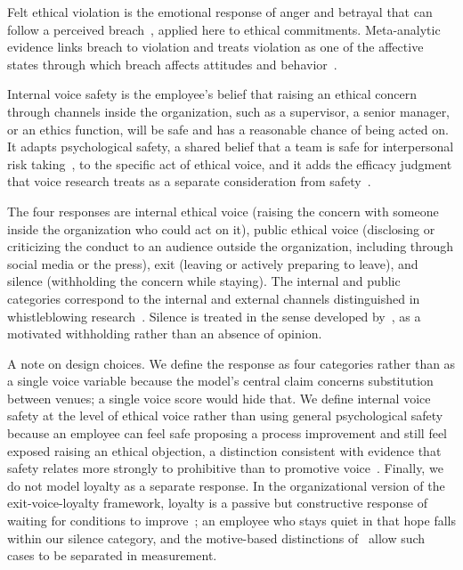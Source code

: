 Felt ethical violation is the emotional response of anger and betrayal that can follow a perceived breach~\citep{morrison1997employees}, applied here to ethical commitments. Meta-analytic evidence links breach to violation and treats violation as one of the affective states through which breach affects attitudes and behavior~\citep{zhao2007impact}.

Internal voice safety is the employee's belief that raising an ethical concern through channels inside the organization, such as a supervisor, a senior manager, or an ethics function, will be safe and has a reasonable chance of being acted on. It adapts psychological safety, a shared belief that a team is safe for interpersonal risk taking~\citep{edmondson1999psychological}, to the specific act of ethical voice, and it adds the efficacy judgment that voice research treats as a separate consideration from safety~\citep{morrison2014employee}.

The four responses are internal ethical voice (raising the concern with someone inside the organization who could act on it), public ethical voice (disclosing or criticizing the conduct to an audience outside the organization, including through social media or the press), exit (leaving or actively preparing to leave), and silence (withholding the concern while staying). The internal and public categories correspond to the internal and external channels distinguished in whistleblowing research~\citep{dworkin1998internal,kaptein2011inaction}. Silence is treated in the sense developed by~\citet{vandyne2003conceptualizing}, as a motivated withholding rather than an absence of opinion.

A note on design choices. We define the response as four categories rather than as a single voice variable because the model's central claim concerns substitution between venues; a single voice score would hide that. We define internal voice safety at the level of ethical voice rather than using general psychological safety because an employee can feel safe proposing a process improvement and still feel exposed raising an ethical objection, a distinction consistent with evidence that safety relates more strongly to prohibitive than to promotive voice~\citep{liang2012psychological}. Finally, we do not model loyalty as a separate response. In the organizational version of the exit-voice-loyalty framework, loyalty is a passive but constructive response of waiting for conditions to improve~\citep{farrell1983exit}; an employee who stays quiet in that hope falls within our silence category, and the motive-based distinctions of~\citet{vandyne2003conceptualizing} allow such cases to be separated in measurement.

